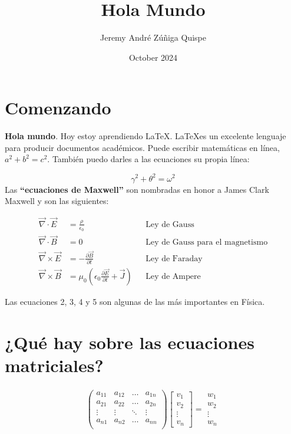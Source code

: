 \documentclass{article}
\title{Hola Mundo}
\author{Jeremy André Zúñiga Quispe}
\date{October 2024}
\begin{document}
\maketitle

\section{Comenzando}
\textbf{Hola mundo}. Hoy estoy aprendiendo \LaTeX . \LaTeX es un excelente lenguaje para producir documentos académicos. Puede escribir matemáticas en línea, $a^2 + b^2 = c^2$. También puedo darles a las ecuaciones su propia línea:

\begin{equation}
\gamma^2+\theta^2=\omega^2    
\end{equation}
Las \textbf{“ecuaciones de Maxwell”} son nombradas en honor a James Clark Maxwell y son las siguientes:
\begin{equations}
\begin{align}
    \vec{\nabla} \cdot \vec{E} &= \frac{\rho}{\epsilon_0} && \text{Ley de Gauss} \\
    \vec{\nabla} \cdot \vec{B} &= 0 && \text{Ley de Gauss para el magnetismo} \\
    \vec{\nabla} \times \vec{E} &= -\frac{\partial \vec{B}}{\partial t} && \text{Ley de Faraday} \\
    \vec{\nabla} \times \vec{B} &= \mu_0 \left( \epsilon_0 \frac{\partial \vec{E}}{\partial t} + \vec{J} \right) && \text{Ley de Ampere}
\end{align}
\end{equations}

Las ecuaciones 2, 3, 4 y 5 son algunas de las más importantes en Física.
\section{¿Qué hay sobre las ecuaciones matriciales?}
\begin{align*}
\begin{pmatrix}
    a_{11} & a_{12} & \dots & a_{1n} \\
    a_{21} & a_{22} & \dots & a_{2n} \\
    \vdots & \vdots & \ddots & \vdots \\
    a_{n1} & a_{n2} & \dots & a_{nn} \\
\end{pmatrix}
\begin{bmatrix}
    v_1 \\
    v_2\\
    \vdots\\
    v_n
\end{bmatrix}
=
\begin{matrix}
    w_1 \\
    w_2\\
    \vdots\\
    w_n  
\end{matrix}  
\end{align*}
\end{document}
